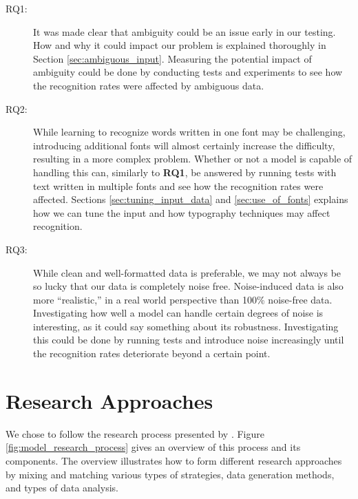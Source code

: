 \begin{description}
    \item[RQ1:]{It was made clear that ambiguity could be an issue early in our testing. How and why it could impact our problem is explained thoroughly in Section \ref{sec:ambiguous_input}. Measuring the potential impact of ambiguity could be done by conducting tests and experiments to see how the recognition rates were affected by ambiguous data.}
    \item[RQ2:]{While learning to recognize words written in one font may be challenging, introducing additional fonts will almost certainly increase the difficulty, resulting in a more complex problem. Whether or not a model is capable of handling this can, similarly to \textbf{RQ1}, be answered by running tests with text written in multiple fonts and see how the recognition rates were affected. Sections \ref{sec:tuning_input_data} and \ref{sec:use_of_fonts} explains how we can tune the input and how typography techniques may affect recognition.}
    \item[RQ3:]{While clean and well-formatted data is preferable, we may not always be so lucky that our data is completely noise free. Noise-induced data is also more ``realistic,'' in a real world perspective than 100\% noise-free data. Investigating how well a model can handle certain degrees of noise is interesting, as it could say something about its robustness. Investigating this could be done by running tests and introduce noise increasingly until the recognition rates deteriorate beyond a certain point.}
\end{description}


\section{Research Approaches}
\label{sec:research_approaches}
We chose to follow the research process presented by \citet[chap.~3]{oates2005researching}. Figure \ref{fig:model_research_process} gives an overview of this process and its components. The overview illustrates how to form different research approaches by mixing and matching various types of strategies, data generation methods, and types of data analysis.

